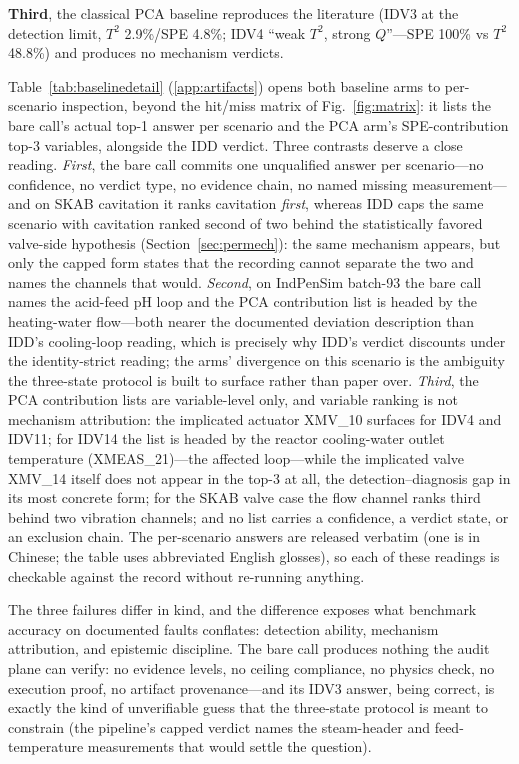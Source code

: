 \documentclass[preprint,10pt]{elsarticle}
\begin{document}
\textbf{Third}, the classical PCA baseline reproduces the literature (IDV3 at the detection limit, $T^2$ 2.9\%/SPE 4.8\%; IDV4 ``weak $T^2$, strong $Q$''---SPE 100\% vs $T^2$ 48.8\%) and produces no mechanism verdicts.

Table~\ref{tab:baselinedetail} (\ref{app:artifacts}) opens both baseline arms to per-scenario inspection, beyond the hit/miss matrix of Fig.~\ref{fig:matrix}: it lists the bare call's actual top-1 answer per scenario and the PCA arm's SPE-contribution top-3 variables, alongside the IDD verdict. Three contrasts deserve a close reading. \emph{First}, the bare call commits one unqualified answer per scenario---no confidence, no verdict type, no evidence chain, no named missing measurement---and on SKAB cavitation it ranks cavitation \emph{first}, whereas IDD caps the same scenario with cavitation ranked second of two behind the statistically favored valve-side hypothesis (Section~\ref{sec:permech}): the same mechanism appears, but only the capped form states that the recording cannot separate the two and names the channels that would. \emph{Second}, on IndPenSim batch-93 the bare call names the acid-feed pH loop and the PCA contribution list is headed by the heating-water flow---both nearer the documented deviation description than IDD's cooling-loop reading, which is precisely why IDD's verdict discounts under the identity-strict reading; the arms' divergence on this scenario is the ambiguity the three-state protocol is built to surface rather than paper over. \emph{Third}, the PCA contribution lists are variable-level only, and variable ranking is not mechanism attribution: the implicated actuator XMV\_10 surfaces for IDV4 and IDV11; for IDV14 the list is headed by the reactor cooling-water outlet temperature (XMEAS\_21)---the affected loop---while the implicated valve XMV\_14 itself does not appear in the top-3 at all, the detection--diagnosis gap in its most concrete form; for the SKAB valve case the flow channel ranks third behind two vibration channels; and no list carries a confidence, a verdict state, or an exclusion chain. The per-scenario answers are released verbatim (one is in Chinese; the table uses abbreviated English glosses), so each of these readings is checkable against the record without re-running anything.

The three failures differ in kind, and the difference exposes what benchmark accuracy on documented faults conflates: detection ability, mechanism attribution, and epistemic discipline. The bare call produces nothing the audit plane can verify: no evidence levels, no ceiling compliance, no physics check, no execution proof, no artifact provenance---and its IDV3 answer, being correct, is exactly the kind of unverifiable guess that the three-state protocol is meant to constrain (the pipeline's capped verdict names the steam-header and feed-temperature measurements that would settle the question).
\end{document}
